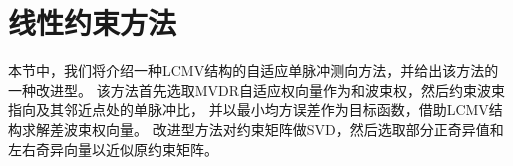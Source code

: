 \documentclass[master]{thesis-uestc}
\begin{document}


\section{线性约束方法}
本节中，我们将介绍一种LCMV结构的自适应单脉冲测向方法，并给出该方法的一种改进型。
该方法首先选取MVDR自适应权向量作为和波束权，然后约束波束指向及其邻近点处的单脉冲比，
并以最小均方误差作为目标函数，借助LCMV结构求解差波束权向量。
改进型方法对约束矩阵做SVD，然后选取部分正奇异值和左右奇异向量以近似原约束矩阵。
\end{document}
